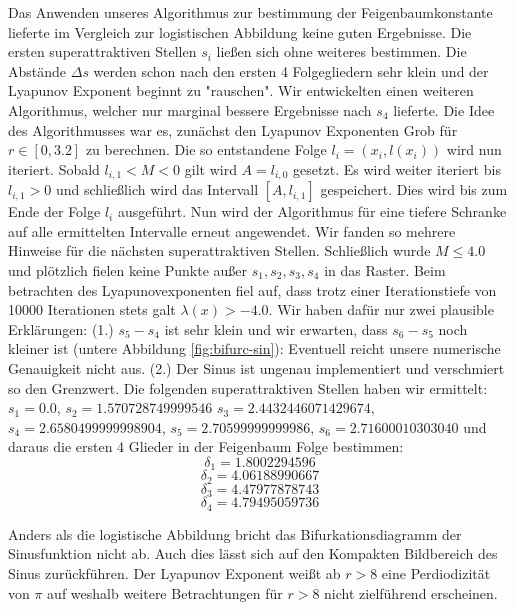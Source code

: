 \documentclass{scrartcl}
\begin{document}
Das Anwenden unseres Algorithmus zur bestimmung der Feigenbaumkonstante lieferte im Vergleich zur logistischen Abbildung keine guten Ergebnisse. Die ersten superattraktiven Stellen $s_i$ ließen sich ohne weiteres bestimmen. Die Abstände $\Delta s$ werden schon nach den ersten 4 Folgegliedern sehr klein und der Lyapunov Exponent beginnt zu "rauschen". 
Wir entwickelten einen weiteren Algorithmus, welcher nur marginal bessere Ergebnisse nach $s_4$ lieferte. Die Idee des Algorithmusses war es, zunächst den Lyapunov Exponenten Grob für $r\in [0,3.2]$ zu berechnen. 
Die so entstandene Folge $l_i=(x_i, l(x_i))$ wird nun iteriert. Sobald $l_{i,1} < M < 0$ gilt wird $A=l_{i,0}$ gesetzt. Es wird weiter iteriert bis $l_{i,1} > 0$ und schließlich wird das Intervall $[A, l_{i,1}]$ gespeichert. Dies wird bis zum Ende der Folge $l_i$ ausgeführt. 
Nun wird der Algorithmus für eine tiefere Schranke auf alle ermittelten Intervalle erneut angewendet. 
Wir fanden so mehrere Hinweise für die nächsten superattraktiven Stellen. 
Schließlich wurde $M \leq 4.0$ und plötzlich fielen keine Punkte außer $s_1, s_2, s_3, s_4$ in das Raster. Beim betrachten des Lyapunovexponenten fiel auf, dass trotz einer Iterationstiefe von 10000 Iterationen stets galt $\lambda(x)>-4.0$. 
Wir haben dafür nur zwei plausible Erklärungen: 
(1.) $s_5-s_4$ ist sehr klein und wir erwarten, dass $s_6-s_5$ noch kleiner ist (untere Abbildung \ref{fig:bifurc-sin}): Eventuell reicht unsere numerische Genauigkeit nicht aus. 
(2.) Der Sinus ist ungenau implementiert und verschmiert so den Grenzwert. 
Die folgenden superattraktiven Stellen haben wir ermittelt: $s_1=0.0$, $s_2=1.570728749999546$ $s_3=2.4432446071429674$, $s_4=2.6580499999998904$, $s_5=2.70599999999986$, $s_6=2.71600010303040$ und daraus die ersten 4 Glieder in der Feigenbaum Folge bestimmen:
$$\delta_1=1.8002294596$$
$$\delta_2=4.06188990667$$
$$\delta_3=4.47977878743$$
$$\delta_4=4.79495059736$$

Anders als die logistische Abbildung bricht das Bifurkationsdiagramm der Sinusfunktion nicht ab. Auch dies lässt sich auf den Kompakten Bildbereich des Sinus zurückführen. Der Lyapunov Exponent weißt ab $r>8$ eine Perdiodizität von $\pi$ auf weshalb weitere Betrachtungen für $r>8$ nicht zielführend erscheinen.
\end{document}
